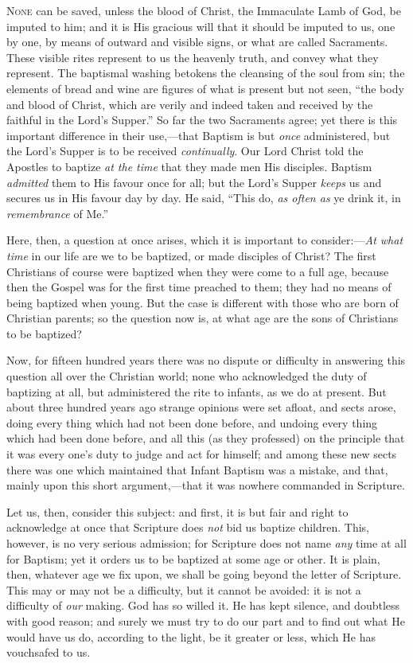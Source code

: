 N\textsc{one} can be saved, unless the blood of Christ, the
Immaculate Lamb of God, be imputed to him; and it is His
gracious will that it should be imputed to us, one by
one, by means of outward and visible signs, or what are
called Sacraments. These visible rites represent to us
the heavenly truth, and convey what they represent. The
baptismal washing betokens the cleansing of the soul from
sin; the elements of bread and wine are figures of what
is present but not seen, ``the body and blood of
Christ, which are verily and indeed taken and received by
the faithful in the Lord's Supper.'' So far the two
Sacraments agree; yet there is this important difference
in their use,—that Baptism is but \emph{once} administered,
but the Lord's Supper is to be received \emph{continually}.
Our Lord Christ told the Apostles to baptize \emph{at the
time} that they made men His disciples. Baptism \emph{admitted}
them to His favour once for all; but the Lord's Supper \emph{keeps}
us and secures us in His favour day by day. He said,
``This do, \emph{as often as} ye drink it, in \emph{remembrance}
of Me.''

Here, then, a question at once arises, which it is
important to consider:—\emph{At what time} in our
life are we to be baptized, or made disciples of Christ?
The first Christians of course were baptized when they
were come to a full age, because then the Gospel was for
the first time preached to them; they had no means of
being baptized when young. But the case is different with
those who are born of Christian parents; so the question
now is, at what age are the sons of Christians to be
baptized?

Now, for fifteen hundred years there was no dispute or
difficulty in answering this question all over the
Christian world; none who acknowledged the duty of
baptizing at all, but administered the rite to infants,
as we do at present. But about three hundred years ago
strange opinions were set afloat, and sects arose, doing
every thing which had not been done before, and undoing
every thing which had been done before, and all this (as
they professed) on the principle that it was every one's
duty to judge and act for himself; and among these new
sects there was one which maintained that Infant Baptism
was a mistake, and that, mainly upon this short
argument,—that it was nowhere commanded in
Scripture.

Let us, then, consider this subject: and first, it is
but fair and right to acknowledge at once that Scripture
does \emph{not} bid us baptize children. This, however, is no
very serious admission; for Scripture does not name \emph{any}
time at all for Baptism; yet it orders us to be baptized
at some age or other. It is plain, then, whatever age we
fix upon, we shall be going beyond the letter of
Scripture. This may or may not be a difficulty, but it
cannot be avoided: it is not a difficulty of \emph{our}
making. God has so willed it. He has kept silence, and
doubtless with good reason; and surely we must try to do
our part and to find out what He would have us do,
according to the light, be it greater or less, which He
has vouchsafed to us.

